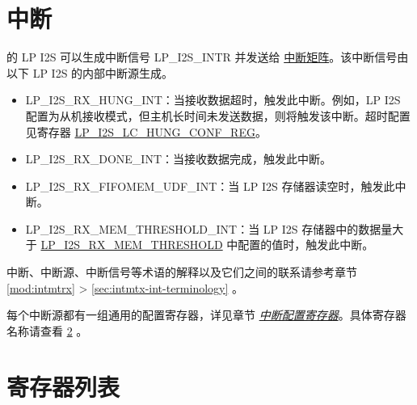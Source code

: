 \documentclass[main\_\_CN.tex]{subfiles}
\begin{document}

\section{中断}
\label{sec:lpi2s-intr}

\chipname{} 的 LP I2S 可以生成中断信号 LP\_I2S\_INTR 并发送给 \hyperref[mod:intmtrx]{中断矩阵}。该中断信号由以下 LP I2S 的内部中断源生成。

\begin{itemize}
\item \label{int:LPI2SRXHUNGINT}LP\_I2S\_RX\_HUNG\_INT：当接收数据超时，触发此中断。例如，LP I2S 配置为从机接收模式，但主机长时间未发送数据，则将触发该中断。超时配置见寄存器 \hyperref[regdesc:LPI2SLCHUNGCONFREG]{LP\_I2S\_LC\_HUNG\_CONF\_REG}。
\item \label{int:LPI2SRXDONEINT}LP\_I2S\_RX\_DONE\_INT：当接收数据完成，触发此中断。
\item 
\label{int:LPI2SRXFIFOMEMUDFINT}LP\_I2S\_RX\_FIFOMEM\_UDF\_INT：当 LP I2S 存储器读空时，触发此中断。
\item 
\label{int:LPI2SRXMEMTHRESHOLDINT}LP\_I2S\_RX\_MEM\_THRESHOLD\_INT：当 LP I2S 存储器中的数据量大于 \hyperref[fielddesc:LPI2SRXMEMTHRESHOLD]{LP\_I2S\_RX\_MEM\_THRESHOLD} 中配置的值时，触发此中断。
\end{itemize}

\begin{tiplisting}
中断、中断源、中断信号等术语的解释以及它们之间的联系请参考章节 \ref{mod:intmtrx} \textit{} > \ref{sec:intmtx-int-terminology} \textit{}。
\end{tiplisting}

每个中断源都有一组通用的配置寄存器，详见章节 \hyperref[interrupt-config-registers]{\textit{中断配置寄存器}}。具体寄存器名称请查看 \ref{sec:lpi2s-reg-summ} \textit{}。






\newpage
\hypertarget{lpi2s-reg-summ}{}
\section{寄存器列表}
\label{sec:lpi2s-reg-summ}
\end{document}
